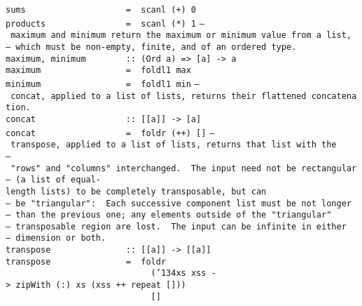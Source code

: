\mbox{\tt sums\ \ \ \ \ \ \ \ \ \ \ \ \ \ \ \ \ \ \ \ =\ \ scanl\ (+)\ 0}\\
\mbox{\tt products\ \ \ \ \ \ \ \ \ \ \ \ \ \ \ \ =\ \ scanl\ (*)\ 1}
%
%
\eprogB\noindent\bprogB
\mbox{\tt --\ maximum\ and\ minimum\ return\ the\ maximum\ or\ minimum\ value\ from\ a\ list,}\\
\mbox{\tt --\ which\ must\ be\ non-empty,\ finite,\ and\ of\ an\ ordered\ type.}\\
\mbox{\tt maximum,\ minimum\ \ \ \ \ \ \ \ ::\ (Ord\ a)\ =>\ [a]\ ->\ a}\\
\mbox{\tt maximum\ \ \ \ \ \ \ \ \ \ \ \ \ \ \ \ \ =\ \ foldl1\ max}\\
\mbox{\tt minimum\ \ \ \ \ \ \ \ \ \ \ \ \ \ \ \ \ =\ \ foldl1\ min}
%
%
\eprogB\noindent\bprogB
\mbox{\tt --\ concat,\ applied\ to\ a\ list\ of\ lists,\ returns\ their\ flattened\ concatenation.}\\
\mbox{\tt concat\ \ \ \ \ \ \ \ \ \ \ \ \ \ \ \ \ \ ::\ [[a]]\ ->\ [a]}\\
\mbox{\tt concat\ \ \ \ \ \ \ \ \ \ \ \ \ \ \ \ \ \ =\ \ foldr\ (++)\ []}
%
\eprogB\noindent\bprogB
\mbox{\tt --\ transpose,\ applied\ to\ a\ list\ of\ lists,\ returns\ that\ list\ with\ the}\\
\mbox{\tt --\ "rows"\ and\ "columns"\ interchanged.\ \ The\ input\ need\ not\ be\ rectangular}\\
\mbox{\tt --\ (a\ list\ of\ equal-length\ lists)\ to\ be\ completely\ transposable,\ but\ can}\\
\mbox{\tt --\ be\ "triangular":\ \ Each\ successive\ component\ list\ must\ be\ not\ longer}\\
\mbox{\tt --\ than\ the\ previous\ one;\ any\ elements\ outside\ of\ the\ "triangular"}\\
\mbox{\tt --\ transposable\ region\ are\ lost.\ \ The\ input\ can\ be\ infinite\ in\ either}\\
\mbox{\tt --\ dimension\ or\ both.}\\
\mbox{\tt transpose\ \ \ \ \ \ \ \ \ \ \ \ \ \ \ ::\ [[a]]\ ->\ [[a]]}\\
\mbox{\tt transpose\ \ \ \ \ \ \ \ \ \ \ \ \ \ \ =\ \ foldr\ }\\
\mbox{\tt \ \ \ \ \ \ \ \ \ \ \ \ \ \ \ \ \ \ \ \ \ \ \ \ \ \ \ \ \ ({\char'134}xs\ xss\ ->\ zipWith\ (:)\ xs\ (xss\ ++\ repeat\ []))}\\
\mbox{\tt \ \ \ \ \ \ \ \ \ \ \ \ \ \ \ \ \ \ \ \ \ \ \ \ \ \ \ \ \ []}
%
